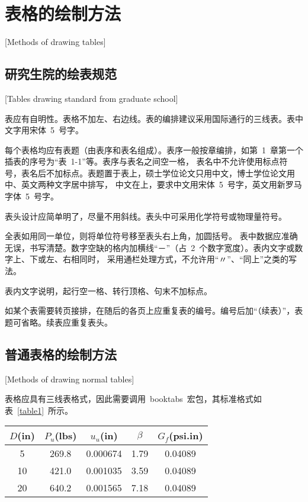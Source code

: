 
\chapter{表格的绘制方法}[Methods of drawing tables]
\section{研究生院的绘表规范}[Tables drawing standard from graduate school]

表应有自明性。表格不加左、右边线。表的编排建议采用国际通行的三线表。表中文字用宋体~5~号字。

每个表格均应有表题（由表序和表名组成）。表序一般按章编排，如第~1~章第一个插表的序号为“表~1-1”等。表序与表名之间空一格，
表名中不允许使用标点符号，表名后不加标点。表题置于表上，硕士学位论文只用中文，博士学位论文用中、英文两种文字居中排写，
中文在上，要求中文用宋体~5~号字，英文用新罗马字体~5~号字。

表头设计应简单明了，尽量不用斜线。表头中可采用化学符号或物理量符号。

全表如用同一单位，则将单位符号移至表头右上角，加圆括号。
表中数据应准确无误，书写清楚。数字空缺的格内加横线“－”（占~2~个数字宽度）。表内文字或数字上、下或左、右相同时，
采用通栏处理方式，不允许用“〃”、“同上”之类的写法。

表内文字说明，起行空一格、转行顶格、句末不加标点。

如某个表需要转页接排，在随后的各页上应重复表的编号。编号后加“（续表）”，表题可省略。续表应重复表头。

\section{普通表格的绘制方法}[Methods of drawing normal tables]

表格应具有三线表格式，因此需要调用~booktabs~宏包，其标准格式如表~\ref{table1}~所示。
\begin{table}[htbp]
\vspace{0.5em}\centering\wuhao
\begin{tabular}{ccccc}
\toprule[1.5pt]
$D$(in) & $P_u$(lbs) & $u_u$(in) & $\beta$ & $G_f$(psi.in)\\
\midrule[1pt]
 5 & 269.8 & 0.000674 & 1.79 & 0.04089\\
10 & 421.0 & 0.001035 & 3.59 & 0.04089\\
20 & 640.2 & 0.001565 & 7.18 & 0.04089\\
\bottomrule[1.5pt]
\end{tabular}
\end{table}

